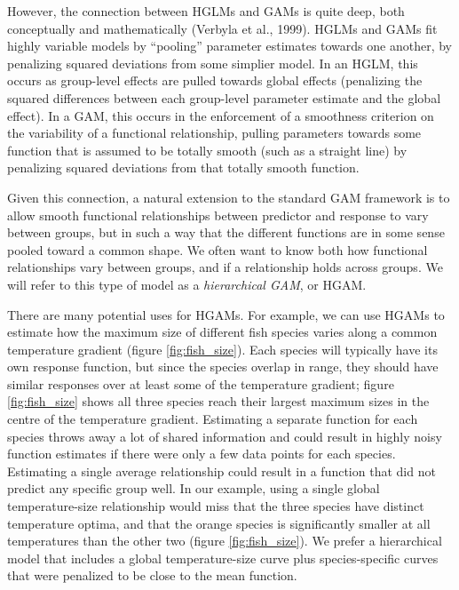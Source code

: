 \documentclass[12pt]{article}
\begin{document}
However, the connection between HGLMs and GAMs is quite deep, both
conceptually and mathematically (Verbyla et al., 1999). HGLMs and GAMs
fit highly variable models by ``pooling'' parameter estimates towards
one another, by penalizing squared deviations from some simplier model.
In an HGLM, this occurs as group-level effects are pulled towards global
effects (penalizing the squared differences between each group-level
parameter estimate and the global effect). In a GAM, this occurs in the
enforcement of a smoothness criterion on the variability of a functional
relationship, pulling parameters towards some function that is assumed
to be totally smooth (such as a straight line) by penalizing squared
deviations from that totally smooth function.

Given this connection, a natural extension to the standard GAM framework
is to allow smooth functional relationships between predictor and
response to vary between groups, but in such a way that the different
functions are in some sense pooled toward a common shape. We often want
to know both how functional relationships vary between groups, and if a
relationship holds across groups. We will refer to this type of model as
a \emph{hierarchical GAM}, or HGAM.

There are many potential uses for HGAMs. For example, we can use HGAMs
to estimate how the maximum size of different fish species varies along
a common temperature gradient (figure \ref{fig:fish_size}). Each species
will typically have its own response function, but since the species
overlap in range, they should have similar responses over at least some
of the temperature gradient; figure \ref{fig:fish_size} shows all three
species reach their largest maximum sizes in the centre of the
temperature gradient. Estimating a separate function for each species
throws away a lot of shared information and could result in highly noisy
function estimates if there were only a few data points for each
species. Estimating a single average relationship could result in a
function that did not predict any specific group well. In our example,
using a single global temperature-size relationship would miss that the
three species have distinct temperature optima, and that the orange
species is significantly smaller at all temperatures than the other two
(figure \ref{fig:fish_size}). We prefer a hierarchical model that
includes a global temperature-size curve plus species-specific curves
that were penalized to be close to the mean function.
\end{document}
